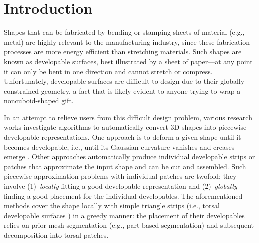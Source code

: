 




\section{Introduction}  
\label{sec:introduction}

Shapes that can be fabricated by bending or stamping sheets of material (e.g., metal) are highly relevant to the manufacturing industry, since these fabrication processes are more energy efficient than stretching materials. Such shapes are known as developable surfaces, best illustrated by a sheet of paper---at any point it can only be bent in one direction and cannot stretch or compress. Unfortunately, developable surfaces are difficult to design due to their globally constrained geometry, a fact that is likely evident to anyone trying to wrap a noncuboid-shaped gift.

In an attempt to relieve users from this difficult design problem, various research works investigate algorithms to automatically convert 3D shapes into piecewise developable representations. One approach is to deform a given shape until it becomes developable, i.e., until its Gaussian curvature vanishes \cite{wang2004achieving} and creases emerge \cite{stein_dev}. 
%
Other approaches automatically produce individual developable strips \cite{massarwi2007papercraft,mitani2004making} or patches \cite{Shatz:Papercraft:2006} that approximate the input shape and can be cut and assembled. 
Such piecewise approximation problems with individual patches are twofold: they involve (1)~\emph{locally} fitting a good developable representation and (2)~\emph{globally} finding a good placement for the individual developables. The aforementioned methods cover the shape locally with simple triangle strips (i.e., torsal developable surfaces \cite{Pottmann:Book:2001}) in a greedy manner: the placement of their developables relies on prior mesh segmentation (e.g., part-based segmentation) and subsequent decomposition into torsal patches.

